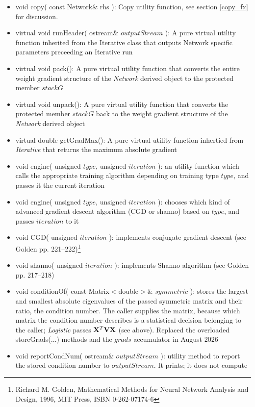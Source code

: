 \documentclass{report}
\def\beginred{\color{red}}
\def\endcolor{\color{black}}
\begin{document}
\begin{itemize}
\begin{itemize}
\item \beginred void copy( const Network\& rhs ): Copy utility
      function, see section \ref{copy_fx} for discussion. \endcolor
\item virtual void runHeader( ostream\& $outputStream$ ): A pure
      virtual utility function inherited from the Iterative class
      that outputs Network specific parameters preceeding an
      Iterative run
\item \beginred virtual void pack(): A pure virtual utility function
      that converts the entire weight gradient structure of the {\em
      Network} derived object to the protected member $stackG$
      \endcolor
\item \beginred virtual void unpack(): A pure virtual utility function
      that converts the protected member $stackG$ back to the weight
      gradient structure of the {\em Network} derived object\endcolor
\item virtual double getGradMax(): A pure virtual utility function
      inhertied from {\em Iterative} that returns the maximum absolute
      gradient
\item void engine( unsigned $type$, unsigned $iteration$ ): an utility
      function which calls the appropriate training algorithm
      depending on training type $type$, and passes it the current
      iteration
\item void engine( unsigned $type$, unsigned $iteration$ ): chooses
which
      kind of advanced gradient descent algorithm (CGD or shanno)
      based
      on $type$, and passes $iteration$ to it
\item void CGD( unsigned $iteration$ ): implements conjugate gradient
      descent (see Golden pp. 221--222)\footnote{Richard M. Golden,
      Mathematical Methods for Neural Network Analysis and Design,
      1996, MIT Press, ISBN 0-262-07174-6}
\item void shanno( unsigned $iteration$ ): implements Shanno algorithm
      (see Golden pp. 217--218)
\item void conditionOf( const Matrix$<$double$>$\& $symmetric$ ):
      stores the largest and smallest absolute eigenvalues of the
      passed symmetric matrix and their ratio, the condition number.
      The caller supplies the matrix, because which matrix the
      condition number describes is a statistical decision belonging
      to the caller; {\em Logistic} passes ${\bf X}^T{\bf V}{\bf X}$
      (see above).  Replaced the overloaded storeGrads($\ldots$)
      methods and the $grads$ accumulator in August 2026
\item void reportCondNum( ostream\& $outputStream$ ): utility method
      to report the stored condition number to $outputStream$.  It
      prints; it does not compute

\end{itemize}

\end{itemize}
\end{document}
